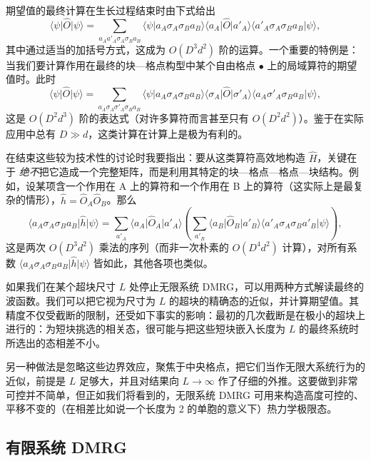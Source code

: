 \documentclass[a4paper,10pt,oneside,onecolumn,1p,times]{elsarticle}
\newcommand{\bra}[1]{\mbox{$\langle #1  |$}}
\newcommand{\ket}[1]{\mbox{$| #1  \rangle$}}
\newcommand{\braket}[2]{\mbox{$\langle #1  | #2 \rangle$}} 	%
\begin{document}
期望值的最终计算在生长过程结束时由下式给出
\begin{equation}
\bra{\psi} \hat{O} \ket{\psi} = \sum_{a_A a'_A \sigma_A \sigma_B a_B} \braket{\psi}{a_A \sigma_A \sigma_B a_B} \bra{a_A} \hat{O} \ket{a'_A} \braket{a'_A \sigma_A \sigma_B a_B}{\psi},
\end{equation}
其中通过适当的加括号方式，这成为 $O(D^3 d^2)$ 阶的运算。一个重要的特例是：当我们要计算作用在最终的块—格点构型中某个自由格点 $\bullet$ 上的局域算符的期望值时。此时
\begin{equation}
\bra{\psi} \hat{O} \ket{\psi} = \sum_{a_A \sigma_A \sigma'_A \sigma_B a_B} \braket{\psi}{a_A \sigma_A \sigma_B a_B} \bra{\sigma_A} \hat{O} \ket{\sigma'_A} \braket{a_A \sigma'_A \sigma_B a_B}{\psi},
\end{equation}
这是 $O(D^2 d^3)$ 阶的表达式（对许多算符而言甚至只有 $O(D^2 d^2)$）。鉴于在实际应用中总有 $D \gg d$，这类计算在计算上是极为有利的。

在结束这些较为技术性的讨论时我要指出：要从这类算符高效地构造 $\hat{H}$，关键在于 {\em 绝不}把它造成一个完整矩阵，而是利用其特定的块—格点—格点—块结构。例如，设某项含一个作用在 A 上的算符和一个作用在 B 上的算符（这实际上是最复杂的情形），$\hat{h}=\hat{O}_A \hat{O}_B$。那么
\begin{equation}
\bra{a_A \sigma_A \sigma_B a_B} \hat{h}\ket{\psi} = \sum_{a'_A}
\bra{a_A}\hat{O}_A\ket{a'_A} \left( \sum_{a'_B} \bra{a_B}\hat{O}_B\ket{a'_B}  \braket{a'_A \sigma_A \sigma_B a'_B}{\psi} \right),
\label{eq:hamfragment}
\end{equation}
这是两次 $O(D^3 d^2)$ 乘法的序列（而非一次朴素的 $O( D^4 d^2)$ 计算），对所有系数 $\bra{a_A \sigma_A \sigma_B a_B} \hat{h}\ket{\psi}$ 皆如此，其他各项也类似。

如果我们在某个超块尺寸 $L$ 处停止无限系统 DMRG，可以用两种方式解读最终的波函数。我们可以把它视为尺寸为 $L$ 的超块的精确态的近似，并计算期望值。其精度不仅受截断的限制，还受如下事实的影响：最初的几次截断是在极小的超块上进行的：为短块挑选的相关态，很可能与把这些短块嵌入长度为 $L$ 的最终系统时所选出的态相差不小。

另一种做法是忽略这些边界效应，聚焦于中央格点，把它们当作无限大系统行为的近似，前提是 $L$ 足够大，并且对结果向 $L\rightarrow\infty$ 作了仔细的外推。这要做到非常可控并不简单，但正如我们将看到的，无限系统 DMRG 可用来构造高度可控的、平移不变的（在相差比如说一个长度为 2 的单胞的意义下）热力学极限态。

\subsection{有限系统 DMRG}
\end{document}
